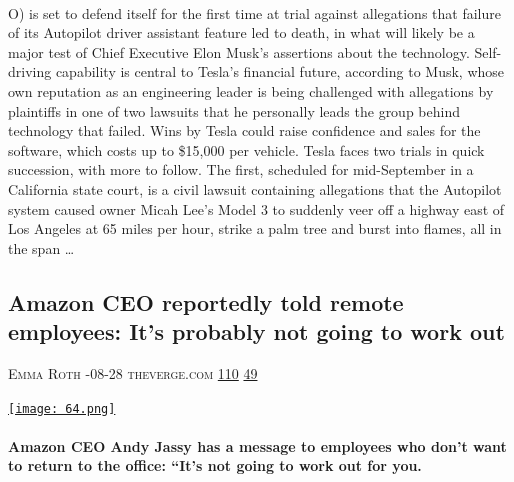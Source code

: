 \documentclass[10pt,a4paper]{article}
\begin{document}
\begin{multicols}{2}
\paragraph{}
O) is set to defend itself for the first time at trial against allegations that failure of its Autopilot driver assistant feature led to death, in what will likely be a major test of Chief Executive Elon Musk's assertions about the technology.
Self-driving capability is central to Tesla’s financial future, according to Musk, whose own reputation as an engineering leader is being challenged with allegations by plaintiffs in one of two lawsuits that he personally leads the group behind technology that failed. Wins by Tesla could raise confidence and sales for the software, which costs up to \$15,000 per vehicle.
Tesla faces two trials in quick succession, with more to follow.
The first, scheduled for mid-September in a California state court, is a civil lawsuit containing allegations that the Autopilot system caused owner Micah Lee’s Model 3 to suddenly veer off a highway east of Los Angeles at 65 miles per hour, strike a palm tree and burst into flames, all in the span
\dots\par
\noindent\begin{minipage}{\linewidth}
\medskip
\subsection{Amazon CEO reportedly told remote employees: It’s probably not going to work out}
\textsc{\footnotesize
{\scriptsize\faUser}\space 
Emma Roth 
{\scriptsize\faCalendar}-08-28 
{\scriptsize\faGlobe}\space 
theverge.com 
{\scriptsize\faThumbsOUp}\space 
\href{http://news.ycombinator.com/item?id=37301728\&utm\_term=comment}{110} 
{\scriptsize\faComments}\space 
\href{http://news.ycombinator.com/item?id=37301728\&utm\_term=comment}{49} 
}
\par\medskip\noindent
\href{https://www.theverge.com/2023/8/28/23849754/amazon-ceo-andy-jassy-remote-employees-return-to-office?utm\_source=hackernewsletter\&utm\_medium=email\&utm\_term=startup\_news}{
    \texttt{[image: 64.png]}
}
\end{minipage}
\paragraph{}
\textbf{Amazon CEO Andy Jassy has a message to employees who don’t want to return to the office: “It’s not going to work out for you.}

\end{multicols}
\end{document}
